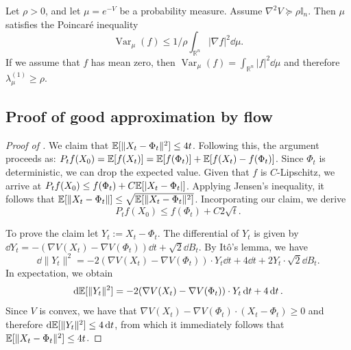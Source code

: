 \begin{lemma} \label{lem:Bakry-Emery-Poincare}
    Let \( \rho > 0 \), and let \( \mu = e^{-V} \) be a probability measure. Assume \( \nabla^2 V \succeq \rho \mathbb{I}_n \). Then \( \mu \) satisfies the Poincaré inequality
    \begin{equation*}
        \operatorname{Var}_\mu(f) \le 1/\rho \int_{\mathbb{R}^n} |\nabla f|^2 \dd\mu.
    \end{equation*}
    If we assume that \( f \) has mean zero, then \( \operatorname{Var}_\mu(f) = \int_{\mathbb{R}^n} |f|^2 \dd\mu \) and therefore \( \lambda^{(1)}_\mu \ge \rho \).
\end{lemma}

\subsection{Proof of good approximation by flow}

\begin{proof}[Proof of ]
We claim that $\mathbb{E}[\|X_t - \Phi_t\|^2] \le 4t$. Following this, the argument proceeds as:  
$P_t f(X_0) = \mathbb{E}[f(X_t)] = \mathbb{E}[f(\Phi_t)] + \mathbb{E}[ f(X_t) - f(\Phi_t) ]$. Since $\Phi_t$ is deterministic, we can drop the expected value. Given that $f$ is $C$-Lipschitz, we arrive at $P_t f(X_0) \le f(\Phi_t) + C \mathbb{E}[|X_t - \Phi_t|]$. Applying Jensen's inequality, it follows that $\mathbb{E}[\|X_t - \Phi_t\|] \le \sqrt{\mathbb{E}[\|X_t - \Phi_t\|^2]}$. Incorporating our claim, we derive
$$
P_t f(X_0) \le  f(\Phi_t) + C 2\sqrt{t}.
$$

    To prove the claim let \( Y_t := X_t - \Phi_t \). The differential of \( Y_t \) is given by \( \dd{Y_t} = -(\nabla V(X_t) - \nabla V(\Phi_t)) \dd{t} + \sqrt{2}\dd{B_t} \).
    By Itô's lemma, we have
    \begin{equation*}
        \dd{\|Y_t\|^2} = -2(\nabla V(X_t) - \nabla V(\Phi_t)) \cdot Y_t \dd{t} + 4 \dd{t} + 2 Y_t \cdot \sqrt{2}\dd{B_t}.
    \end{equation*}
    In expectation, we obtain
    \begin{equation*}
        \dd{\mathbb{E}[\|Y_t\|^2]} = - 2(\nabla V(X_t) - \nabla V(\Phi_t)) \cdot Y_t \dd{t} + 4\dd{t}.
    \end{equation*}
    Since \( V \) is convex, we have that \( \nabla V(X_t) - \nabla V(\Phi_t) \cdot (X_t-\Phi_t) \ge 0 \) and therefore $\dd{\mathbb{E}[\|Y_t\|^2]} \le 4 \dd{t}$, from which it immediately follows that \( \mathbb{E}[\|X_t - \Phi_t\|^2] \le 4t \).
\end{proof}

